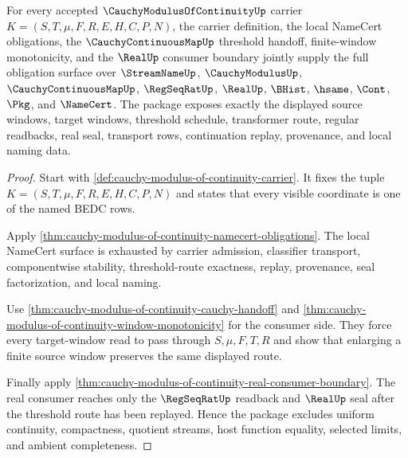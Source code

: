 \begin{theorem}
\label{thm:cauchy-modulus-of-continuity-obligation-closure-package}
For every accepted $\CauchyModulusOfContinuityUp$ carrier
$K=(S,T,\mu,F,R,E,H,C,P,N)$, the carrier definition, the local NameCert
obligations, the $\CauchyContinuousMapUp$ threshold handoff, finite-window
monotonicity, and the $\RealUp$ consumer boundary jointly supply the full
obligation surface over $\StreamNameUp$, $\CauchyModulusUp$,
$\CauchyContinuousMapUp$, $\RegSeqRatUp$, $\RealUp$, $\BHist$, $\hsame$,
$\Cont$, $\Pkg$, and $\NameCert$. The package exposes exactly the displayed
source windows, target windows, threshold schedule, transformer route,
regular readbacks, real seal, transport rows, continuation replay,
provenance, and local naming data.
\end{theorem}
\begin{proof}
Start with \autoref{def:cauchy-modulus-of-continuity-carrier}. It fixes the
tuple $K=(S,T,\mu,F,R,E,H,C,P,N)$ and states that every visible coordinate is
one of the named BEDC rows.

Apply
\autoref{thm:cauchy-modulus-of-continuity-namecert-obligations}. The local
NameCert surface is exhausted by carrier admission, classifier transport,
componentwise stability, threshold-route exactness, replay, provenance, seal
factorization, and local naming.

Use
\autoref{thm:cauchy-modulus-of-continuity-cauchy-handoff} and
\autoref{thm:cauchy-modulus-of-continuity-window-monotonicity} for the
consumer side. They force every target-window read to pass through
$S,\mu,F,T,R$ and show that enlarging a finite source window preserves the
same displayed route.

Finally apply
\autoref{thm:cauchy-modulus-of-continuity-real-consumer-boundary}. The real
consumer reaches only the $\RegSeqRatUp$ readback and $\RealUp$ seal after
the threshold route has been replayed. Hence the package excludes uniform
continuity, compactness, quotient streams, host function equality, selected
limits, and ambient completeness.
\end{proof}

